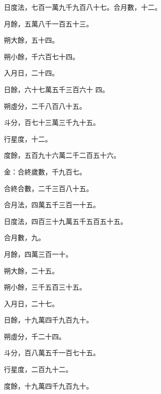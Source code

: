 \begin{pinyinscope}
 日度法，七百一萬九千九百八十七。合月數，十二。



 月餘，五萬八千一百五十三。



 朔大餘，五十四。



 朔小餘，千六百七十四。



 入月日，二十四。



 日餘，六十七萬五千三百六十
 四。



 朔虛分，二千八百八十五。



 斗分，百七十三萬三千九十五。



 行星度，十二。



 度餘，五百九十六萬二千二百五十六。



 金：合終歲數，千九百七。



 合終合數，二千三百八十五。



 合月法，四萬五千三百一十五。



 日度法，四百三十九萬五千五百五十五。



 合月數，九。



 月餘，四萬三百一十。



 朔大餘，二十五。



 朔小餘，三千五百三十五。



 入月日，二十七。



 日餘，十九萬四千九百九十。



 朔虛分，千二十四。



 斗分，百八萬五千一百七十五。



 行星度，二百九十二。



 度餘，十九萬四千九百九十。




\end{pinyinscope}
